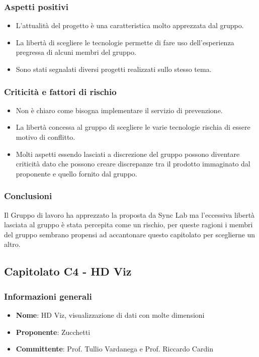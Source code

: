 		\subsubsection{Aspetti positivi}
			\begin{itemize}
				\item L’attualità del progetto è una caratteristica molto apprezzata dal gruppo.
				\item La libertà di scegliere le tecnologie permette di fare uso dell’esperienza pregressa di alcuni membri del gruppo.
				\item Sono stati segnalati diversi progetti realizzati sullo stesso tema.
			\end{itemize}
			
		\subsubsection{Criticità e fattori di rischio}
			\begin{itemize}
				\item Non è chiaro come bisogna implementare il servizio di prevenzione.
				\item La libertà concessa al gruppo di scegliere le varie tecnologie rischia di essere motivo di conflitto.
				\item Molti aspetti essendo lasciati a discrezione del gruppo possono diventare criticità dato che possono creare discrepanze tra il prodotto immaginato dal proponente e quello fornito dal gruppo.
			\end{itemize}
		\subsubsection{Conclusioni}
			Il Gruppo di lavoro ha apprezzato la proposta da Sync Lab ma l’eccessiva libertà lasciata al gruppo è stata percepita come un rischio, per queste ragioni i membri del gruppo sembrano propensi ad accantonare questo capitolato per sceglierne un altro.
\newpage
		
		
				
	\subsection{Capitolato C4 - HD Viz}
		\subsubsection{Informazioni generali}
			\begin{itemize}
				\item\textbf{Nome}: HD Viz, visualizzazione di dati con molte dimensioni
				\item\textbf{Proponente}: Zucchetti
				\item\textbf{Committente}: Prof. Tullio Vardanega e Prof. Riccardo Cardin
			\end{itemize}
			
